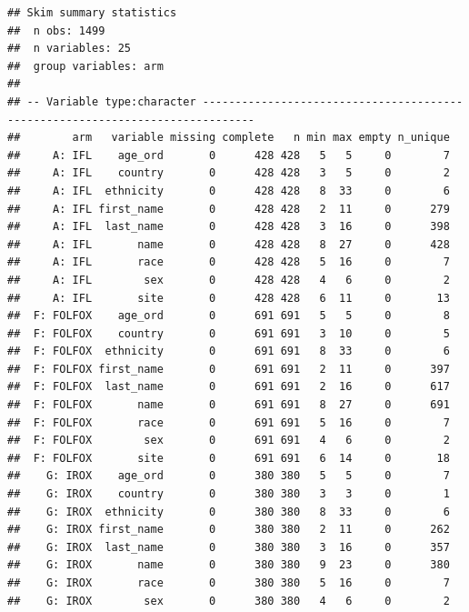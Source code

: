 \documentclass[fleqn,10pt,lineno]{wlpeerj} %
\newenvironment{Shaded}{\begin{snugshade}}{\end{snugshade}}
\newcommand{\CommentTok}[1]{\textcolor[rgb]{0.56,0.35,0.01}{\textit{#1}}}
\newcommand{\KeywordTok}[1]{\textcolor[rgb]{0.13,0.29,0.53}{\textbf{#1}}}
\newcommand{\NormalTok}[1]{#1}
\newcommand{\OperatorTok}[1]{\textcolor[rgb]{0.81,0.36,0.00}{\textbf{#1}}}
\newcommand{\StringTok}[1]{\textcolor[rgb]{0.31,0.60,0.02}{#1}}
\begin{document}
\begin{Shaded}
\end{Shaded}

\begin{verbatim}
## Skim summary statistics
##  n obs: 1499 
##  n variables: 25 
##  group variables: arm 
## 
## -- Variable type:character ------------------------------------------------------------------------------
##        arm   variable missing complete   n min max empty n_unique
##     A: IFL    age_ord       0      428 428   5   5     0        7
##     A: IFL    country       0      428 428   3   5     0        2
##     A: IFL  ethnicity       0      428 428   8  33     0        6
##     A: IFL first_name       0      428 428   2  11     0      279
##     A: IFL  last_name       0      428 428   3  16     0      398
##     A: IFL       name       0      428 428   8  27     0      428
##     A: IFL       race       0      428 428   5  16     0        7
##     A: IFL        sex       0      428 428   4   6     0        2
##     A: IFL       site       0      428 428   6  11     0       13
##  F: FOLFOX    age_ord       0      691 691   5   5     0        8
##  F: FOLFOX    country       0      691 691   3  10     0        5
##  F: FOLFOX  ethnicity       0      691 691   8  33     0        6
##  F: FOLFOX first_name       0      691 691   2  11     0      397
##  F: FOLFOX  last_name       0      691 691   2  16     0      617
##  F: FOLFOX       name       0      691 691   8  27     0      691
##  F: FOLFOX       race       0      691 691   5  16     0        7
##  F: FOLFOX        sex       0      691 691   4   6     0        2
##  F: FOLFOX       site       0      691 691   6  14     0       18
##    G: IROX    age_ord       0      380 380   5   5     0        7
##    G: IROX    country       0      380 380   3   3     0        1
##    G: IROX  ethnicity       0      380 380   8  33     0        6
##    G: IROX first_name       0      380 380   2  11     0      262
##    G: IROX  last_name       0      380 380   3  16     0      357
##    G: IROX       name       0      380 380   9  23     0      380
##    G: IROX       race       0      380 380   5  16     0        7
##    G: IROX        sex       0      380 380   4   6     0        2

\end{verbatim}
\end{document}
